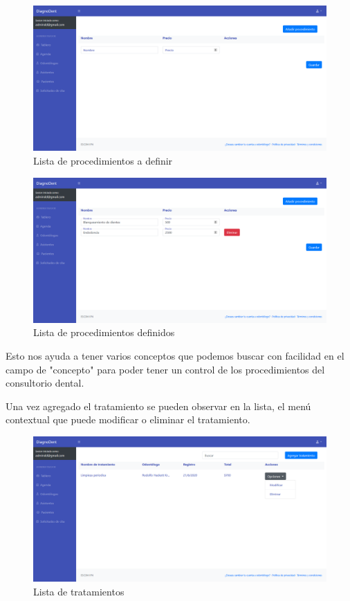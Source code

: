 \begin{figure}[H]
\centering
\includegraphics[width=17cm,keepaspectratio]{pictures/adminodo/pacientes/presupuestos/lista-procedimientos-vacia.png}
\caption{Lista de procedimientos a definir}
\end{figure}

\begin{figure}[H]
\centering
\includegraphics[width=17cm,keepaspectratio]{pictures/adminodo/pacientes/presupuestos/lista-procedimientos-agregar.png}
\caption{Lista de procedimientos definidos}
\end{figure}


Esto nos ayuda a tener varios conceptos que podemos buscar con facilidad en el campo de "concepto" para poder tener un control de los procedimientos del consultorio dental.

\vspace{1em}

Una vez agregado el tratamiento se pueden observar en la lista, el menú contextual que puede modificar o eliminar el tratamiento.

\begin{figure}[H]
\centering
\includegraphics[width=17cm,keepaspectratio]{pictures/adminodo/pacientes/presupuestos/lista-tratamientos-lleno-menu.png}
\caption{Lista de tratamientos}
\end{figure}

